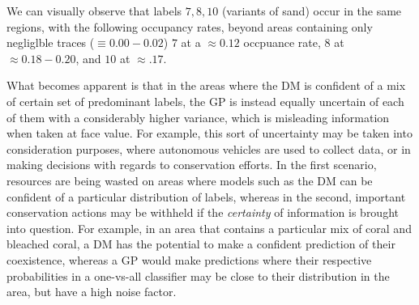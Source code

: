\todo{[PLACEHOLDER]}
We can visually observe that labels $7, 8, 10$ (variants of sand) occur in the same regions, with the following occupancy rates, beyond areas containing only negliglble traces ($\equiv0.00-0.02$) $7$ at a $\approx0.12$ occpuance rate, $8$ at $\approx0.18-0.20$, and $10$ at $\approx.17$.

What becomes apparent is that in the areas where the DM is confident of a mix of certain set of predominant labels, the GP is instead equally uncertain of each of them with a considerably higher variance, which is misleading information when taken at face value. For example, this sort of uncertainty may be taken into consideration purposes, where autonomous vehicles are used to collect data, or in making decisions with regards to conservation efforts. In the first scenario, resources are being wasted on areas where models such as the DM can be confident of a particular distribution of labels, whereas in the second, important conservation actions may be withheld if the \textit{certainty} of information is brought into question. For example, in an area that contains a particular mix of coral and bleached coral, a DM has the potential to make a confident prediction of their coexistence, whereas a GP would make predictions where their respective probabilities in a one-vs-all classifier may be close to their distribution in the area, but have a high noise factor.


